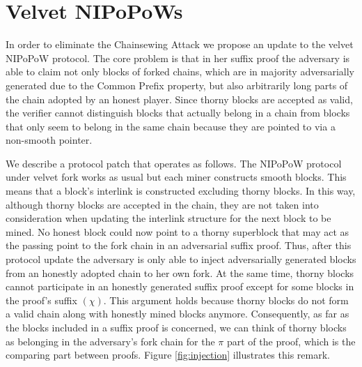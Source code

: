 \section{Velvet NIPoPoWs}
In order to eliminate the Chainsewing Attack we propose an update to the velvet NIPoPoW protocol. The core problem is that in her suffix proof the adversary is able to claim not only blocks of forked chains,  which are in majority adversarially generated due to the Common Prefix property, but also arbitrarily long parts of the chain adopted by an honest player. Since thorny blocks are accepted as valid, the verifier cannot distinguish blocks that actually belong in a chain from blocks that only seem to belong in the same chain because they are pointed to via a non-smooth pointer.

We describe a protocol patch that operates as follows. The NIPoPoW protocol under velvet fork works as usual but each miner constructs smooth blocks. This means that  a block's interlink is constructed excluding thorny blocks. In this way, although thorny blocks are accepted in the chain, they are not taken into consideration when updating the interlink structure for the next block to be mined. No honest block could now point to a thorny superblock that may act as the passing point to the fork chain in an adversarial suffix proof. Thus, after this protocol update the adversary is only able to inject adversarially generated blocks from an honestly adopted chain to her own fork.
At the same time, thorny blocks cannot participate in an honestly
generated suffix proof except for some blocks in the proof's suffix $(\chi)$. This argument holds because thorny blocks do not form a valid chain along with honestly mined blocks anymore. Consequently, as far as the blocks included in a suffix proof is concerned, we can think of thorny blocks as belonging in the adversary's fork chain for the $\pi$ part of the proof,  which is the comparing part between proofs. Figure
\ref{fig:injection} illustrates this remark.\\

